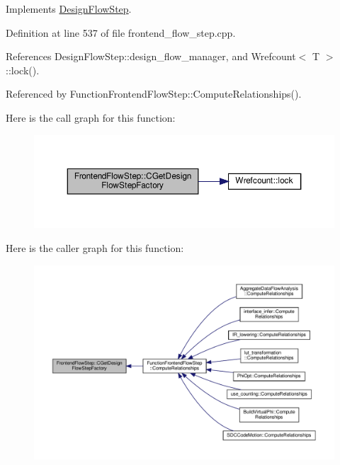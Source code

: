 Implements \hyperlink{classDesignFlowStep_a5510a8d296670a07f6b53312c448994c}{Design\+Flow\+Step}.



Definition at line 537 of file frontend\+\_\+flow\+\_\+step.\+cpp.



References Design\+Flow\+Step\+::design\+\_\+flow\+\_\+manager, and Wrefcount$<$ T $>$\+::lock().



Referenced by Function\+Frontend\+Flow\+Step\+::\+Compute\+Relationships().

Here is the call graph for this function\+:
\nopagebreak
\begin{figure}[H]
\begin{center}
\leavevmode
\includegraphics[width=350pt]{d9/d37/classFrontendFlowStep_a6d36a52be3de210e018389f802f940a7_cgraph}
\end{center}
\end{figure}
Here is the caller graph for this function\+:
\nopagebreak
\begin{figure}[H]
\begin{center}
\leavevmode
\includegraphics[width=350pt]{d9/d37/classFrontendFlowStep_a6d36a52be3de210e018389f802f940a7_icgraph}
\end{center}
\end{figure}
\mbox{\label{classFrontendFlowStep_abeaff70b59734e462d347ed343dd700d}} 
